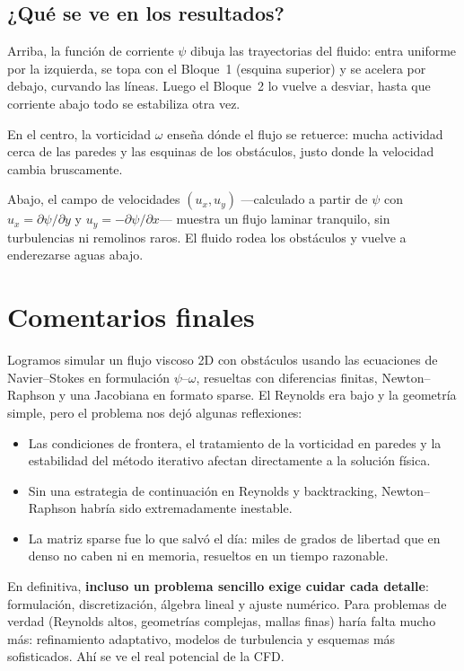 \documentclass[12pt, a4paper]{article}
\begin{document}
\subsection*{¿Qué se ve en los resultados?}

Arriba, la función de corriente \(\psi\) dibuja las trayectorias del fluido: entra
uniforme por la izquierda, se topa con el Bloque~1 (esquina superior) y se acelera
por debajo, curvando las líneas. Luego el Bloque~2 lo vuelve a desviar, hasta que
corriente abajo todo se estabiliza otra vez.

En el centro, la vorticidad \(\omega\) enseña dónde el flujo se retuerce: mucha
actividad cerca de las paredes y las esquinas de los obstáculos, justo donde la
velocidad cambia bruscamente.

Abajo, el campo de velocidades \((u_x, u_y)\) —calculado a partir de \(\psi\)
con \(u_x = \partial\psi/\partial y\) y \(u_y = -\partial\psi/\partial x\)—
muestra un flujo laminar tranquilo, sin turbulencias ni remolinos raros.
El fluido rodea los obstáculos y vuelve a enderezarse aguas abajo.

\section {Comentarios finales}

Logramos simular un flujo viscoso 2D con obstáculos usando las ecuaciones de
Navier--Stokes en formulación \(\psi\)--\(\omega\), resueltas con diferencias
finitas, Newton--Raphson y una Jacobiana en formato sparse. El Reynolds era
bajo y la geometría simple, pero el problema nos dejó algunas reflexiones:

\begin{itemize}
    \item Las condiciones de frontera, el tratamiento de la vorticidad en paredes
          y la estabilidad del método iterativo afectan directamente a la solución
          física.
    \item Sin una estrategia de continuación en Reynolds y backtracking,
          Newton--Raphson habría sido extremadamente inestable.
    \item La matriz sparse fue lo que salvó el día: miles de grados de libertad
          que en denso no caben ni en memoria, resueltos en un tiempo razonable.
\end{itemize}

En definitiva, \textbf{incluso un problema sencillo exige cuidar cada detalle}:
formulación, discretización, álgebra lineal y ajuste numérico. Para problemas de
verdad (Reynolds altos, geometrías complejas, mallas finas) haría falta mucho más:
refinamiento adaptativo, modelos de turbulencia y esquemas más sofisticados. Ahí
se ve el real potencial de la CFD.
\end{document}
